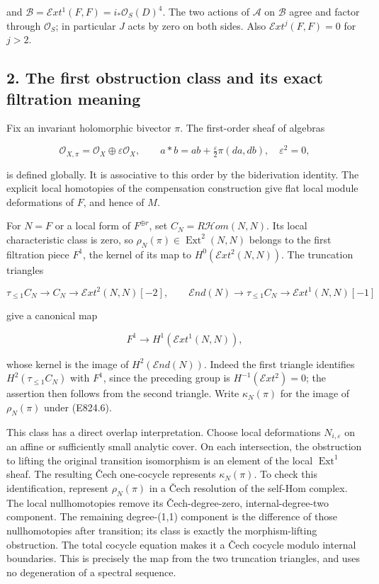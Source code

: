 and \(\mathcal B=\mathcal E xt^1(F,F)=i_*\mathcal O_S(D)^4\). The two
actions of \(\mathcal A\) on \(\mathcal B\) agree and factor through
\(\mathcal O_S\); in particular \(J\) acts by zero on both sides. Also
\(\mathcal E xt^j(F,F)=0\) for \(j>2\).

\subsection{2. The first obstruction class and its exact filtration
meaning}\label{SF-E824-the-first-obstruction-class-and-its-exact-filtration-meaning}

Fix an invariant holomorphic bivector \(\pi\). The first-order sheaf of
algebras

\[
 \mathcal O_{X,\pi}=\mathcal O_X\oplus\varepsilon\mathcal O_X,
 \qquad a*b=ab+\tfrac{\varepsilon}{2}\pi(da,db),
 \quad\varepsilon^2=0,
 \tag{E824.4}
\]

is defined globally. It is associative to this order by the biderivation
identity. The explicit local homotopies of the compensation construction
give flat local module deformations of \(F\), and hence of \(M\).

For \(N=F\) or a local form of \(F^{\oplus r}\), set
\(C_N=R\mathcal H om(N,N)\). Its local characteristic class is zero, so
\(\rho_N(\pi)\in\operatorname{Ext}^2(N,N)\) belongs to the first
filtration piece \(F^1\), the kernel of its map to
\(H^0(\mathcal E xt^2(N,N))\). The truncation triangles

\[
 \tau_{\le1}C_N\to C_N\to\mathcal E xt^2(N,N)[-2],
 \qquad
 \mathcal E nd(N)\to\tau_{\le1}C_N
                   \to\mathcal E xt^1(N,N)[-1]
 \tag{E824.5}
\]

give a canonical map

\[
 F^1\longrightarrow H^1(\mathcal E xt^1(N,N)),
 \tag{E824.6}
\]

whose kernel is the image of \(H^2(\mathcal E nd(N))\). Indeed the first
triangle identifies \(H^2(\tau_{\le1}C_N)\) with \(F^1\), since the
preceding group is \(H^{-1}(\mathcal E xt^2)=0\); the assertion then
follows from the second triangle. Write \(\kappa_N(\pi)\) for the image
of \(\rho_N(\pi)\) under (E824.6).

This class has a direct overlap interpretation. Choose local
deformations \(N_{i,\varepsilon}\) on an affine or sufficiently small
analytic cover. On each intersection, the obstruction to lifting the
original transition isomorphism is an element of the local
\(\operatorname{Ext}^1\) sheaf. The resulting Čech one-cocycle
represents \(\kappa_N(\pi)\). To check this identification, represent
\(\rho_N(\pi)\) in a Čech resolution of the self-Hom complex. The local
nullhomotopies remove its Čech-degree-zero, internal-degree-two
component. The remaining degree-(1,1) component is the difference of
those nullhomotopies after transition; its class is exactly the
morphism-lifting obstruction. The total cocycle equation makes it a Čech
cocycle modulo internal boundaries. This is precisely the map from the
two truncation triangles, and uses no degeneration of a spectral
sequence.

